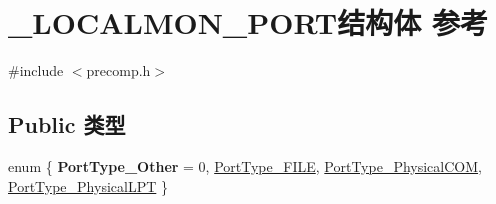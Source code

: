 \hypertarget{struct___l_o_c_a_l_m_o_n___p_o_r_t}{}\section{\+\_\+\+L\+O\+C\+A\+L\+M\+O\+N\+\_\+\+P\+O\+R\+T结构体 参考}
\label{struct___l_o_c_a_l_m_o_n___p_o_r_t}


{\ttfamily \#include $<$precomp.\+h$>$}

\subsection*{Public 类型}
\begin{DoxyCompactItemize}
\item 
enum \{ {\bfseries Port\+Type\+\_\+\+Other} = 0, 
\hyperlink{struct___l_o_c_a_l_m_o_n___p_o_r_t_ac3a20f964d5f5200fe00aa4b364e4b38ab54b282cde64f7081a3d64aea115e813}{Port\+Type\+\_\+\+F\+I\+LE}, 
\hyperlink{struct___l_o_c_a_l_m_o_n___p_o_r_t_ac3a20f964d5f5200fe00aa4b364e4b38ad7c0709c7b3cb6fe8803a2732e827fdb}{Port\+Type\+\_\+\+Physical\+C\+OM}, 
\hyperlink{struct___l_o_c_a_l_m_o_n___p_o_r_t_ac3a20f964d5f5200fe00aa4b364e4b38ae8f5b0a108b21fb4bcda5f98991c8892}{Port\+Type\+\_\+\+Physical\+L\+PT}
 \}
\end{DoxyCompactItemize}
